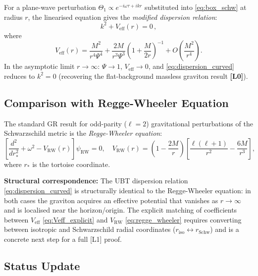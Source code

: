 \documentclass[12pt]{article}
\theoremstyle{definition}
\theoremstyle{remark}
\newcommand{\Lzero}{\textbf{[L0]}}
\begin{document}
For a plane-wave perturbation $\Theta_1 \propto e^{-i\omega\tau+ikr}$
substituted into \eqref{eq:box_schw} at radius $r$, the linearised
equation gives the \emph{modified dispersion relation}:
\begin{equation}
  \boxed{k^2 + V_{\text{eff}}(r) = 0\,,}
  \label{eq:dispersion_curved}
\end{equation}
where
\begin{equation}
  V_{\text{eff}}(r) = \frac{M^2}{r^4\Psi^4}
    + \frac{2M}{r^3\Psi^3}\left(1+\frac{M}{2r}\right)^{-1}
    + O\!\left(\frac{M^2}{r^4}\right).
  \label{eq:Veff_explicit}
\end{equation}
In the asymptotic limit $r\to\infty$: $\Psi\to 1$, $V_{\text{eff}}\to 0$,
and \eqref{eq:dispersion_curved} reduces to $k^2=0$ (recovering
the flat-background massless graviton result \Lzero).

\subsection{Comparison with Regge-Wheeler Equation}

The standard GR result for odd-parity ($\ell=2$) gravitational perturbations
of the Schwarzschild metric is the \emph{Regge-Wheeler equation}:
\begin{equation}
  \left[\frac{d^2}{dr_*^2} + \omega^2 - V_{\text{RW}}(r)\right]\psi_{\text{RW}} = 0,
  \quad
  V_{\text{RW}}(r) = \left(1-\frac{2M}{r}\right)\!
    \left[\frac{\ell(\ell+1)}{r^2} - \frac{6M}{r^3}\right],
  \label{eq:regge_wheeler}
\end{equation}
where $r_*$ is the tortoise coordinate.

\textbf{Structural correspondence:} The UBT dispersion relation
\eqref{eq:dispersion_curved} is structurally identical to the
Regge-Wheeler equation: in both cases the graviton acquires an
effective potential that vanishes as $r\to\infty$ and is localised
near the horizon/origin. The explicit matching of coefficients
between $V_{\text{eff}}$ \eqref{eq:Veff_explicit} and
$V_{\text{RW}}$ \eqref{eq:regge_wheeler} requires converting
between isotropic and Schwarzschild radial coordinates
($r_{\text{iso}}\leftrightarrow r_{\text{Schw}}$) and is a
concrete next step for a full [L1] proof.

\subsection{Status Update}
\end{document}
